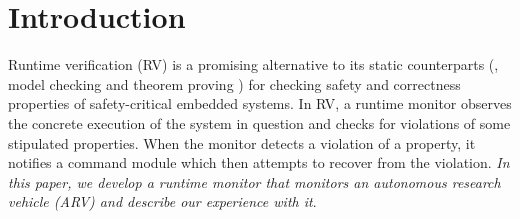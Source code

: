 \section{Introduction}
Runtime verification (RV) is a promising alternative to its static counterparts (\eg, model checking \cite{Clarke1996} and theorem proving \cite{Chang1997})
for checking  safety and correctness properties of safety-critical embedded systems.
In RV, a runtime monitor observes the concrete execution of the system in question and checks for violations of some
stipulated
properties.
When the monitor detects a violation of a property, it notifies a command module which then attempts to recover from the violation. \emph{In this paper, we develop a runtime monitor that monitors an autonomous research vehicle (ARV) and describe our experience with it}.

